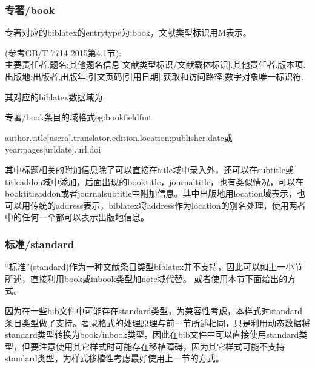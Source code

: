 \subsubsection{专著/book}
\begin{refentry}{}{}
专著对应的biblatex的entrytype为:book，文献类型标识用M表示。

(参考GB/T 7714-2015第4.1节):\\
主要责任者.题名:其他题名信息[文献类型标识/文献载体标识].其他责任者.版本项.出版地:出版者,出版年:引文页码[引用日期].获取和访问路径.数字对象唯一标识符.
\end{refentry}

其对应的biblatex数据域为:
\begin{example}{专著/book条目的域格式}{eg:bookfieldfmt}
\begin{texlist}
author.title[usera].translator.edition.location:publisher,date或year:pages[urldate].url.doi
\end{texlist}
\end{example}

其中标题相关的附加信息除了可以直接在title域中录入外，还可以在subtitle或titleaddon域中添加，后面出现的booktitle，journaltitle，也有类似情况，可以在booktitleaddon或者journalsubtitle中附加信息。其中出版地用location域表示，也可以用传统的address表示，biblatex将address作为location的别名处理，使用两者中的任何一个都可以表示出版地信息。


\subsubsection{标准/standard}\label{sec:standard}
“标准”(standard)作为一种文献条目类型biblatex并不支持，因此可以如上一小节所述，直接利用book或inbook类型加note域代替。
或者使用本节下面给出的方式。

因为在一些bib文件中可能存在standard类型，为兼容性考虑，本样式对standard条目类型做了支持。著录格式的处理原理与前一节所述相同，只是利用动态数据将standard类型转换为book/inbook类型。因此在bib文件中可以直接使用standard类型，但要注意使用其它样式时可能存在移植障碍，因为其它样式可能不支持standard类型，为样式移植性考虑最好使用上一节的方式。

